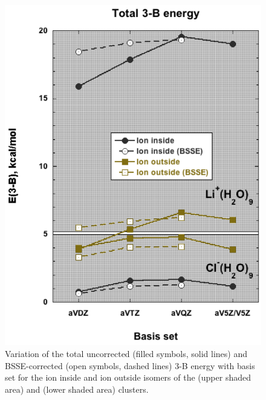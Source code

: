 \begin{figure}[t]
\uwsinglespace
\centering
\includegraphics[width=.5\textwidth]{Figures/Chapter_3/figure_4.pdf}
\begin{spacing}{1.0}
\caption[Variation of the total uncorrected (filled symbols, solid lines) and BSSE-corrected (open symbols, dashed lines) 3-B energy with basis set for the ion inside and ion outside isomers of the  (upper shaded area) and  (lower shaded area) clusters.]{Variation of the total uncorrected (filled symbols, solid lines) and BSSE-corrected (open symbols, dashed lines) 3-B energy with basis set for the ion inside and ion outside isomers of the  (upper shaded area) and  (lower shaded area) clusters.}\label{fig:MBE_II_4}
\end{spacing}
\end{figure}